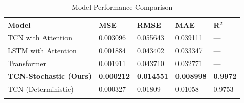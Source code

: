 \begin{table}[h!]
\centering
\caption{Model Performance Comparison}
\label{table:model_performance}
\begin{tabularx}{\linewidth}{lX}
\toprule
\textbf{Model} & \textbf{MSE} & \textbf{RMSE} & \textbf{MAE} & \textbf{R$^2$} \\
\midrule
TCN with Attention   & 0.003096 & 0.055643 & 0.039111 & — \\
LSTM with Attention  & 0.001884 & 0.043402 & 0.033347 & — \\
Transformer          & 0.001911 & 0.043710 & 0.032771 & — \\
\textbf{TCN-Stochastic (Ours)} & \textbf{0.000212} & \textbf{0.014551} & \textbf{0.008998} & \textbf{0.9972} \\
TCN (Deterministic)  & 0.000327 & 0.01809 & 0.01058 & 0.9753 \\
\bottomrule
\label{table:baseline_model}
\end{tabularx}
\end{table}